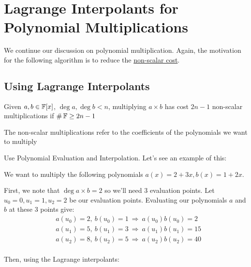 \section{Lagrange Interpolants for Polynomial Multiplications}
We continue our discussion on polynomial multiplication.
Again, the motivation for the following algorithm is to reduce the \underline{non-scalar cost}.

\subsection{Using Lagrange Interpolants}
\begin{theorem}{}{}
    Given $a,b \in \operatorname{\mathbb{F}}[x]$, $\deg a, \deg b < n$, multiplying $a \times b$ has cost $2n - 1$ non-scalar multiplications if $\#\operatorname{\mathbb{F}} \geq 2n - 1$
\end{theorem}
\begin{note}
    The non-scalar multiplications refer to the coefficients of the polynomials we want to multiply
\end{note}

\Idea Use Polynomial Evaluation and Interpolation.
Let's see an example of this:

\begin{example}{}{}
    We want to multiply the following polynomials $a(x) = 2 + 3x, b(x) = 1 + 2x$. 

    First, we note that $\deg a \times b = 2$ so we'll need 3 evaluation points.
    Let $u_0 = 0, u_1 = 1, u_2 = 2$ be our evaluation points.
    Evaluating our polynomials $a$ and $b$ at these 3 points give:
    \begin{align*}
        &a(u_0) = 2, \ b(u_0) = 1 \ \Rightarrow \ a(u_0)b(u_0) = 2 \\
        &a(u_1) = 5, \ b(u_1) = 3 \ \Rightarrow \ a(u_1)b(u_1) = 15 \\
        &a(u_2) = 8, \ b(u_2) = 5 \ \Rightarrow \ a(u_2)b(u_2) = 40 \\
    \end{align*}

    Then, using the Lagrange interpolants:  
        
\end{example}
